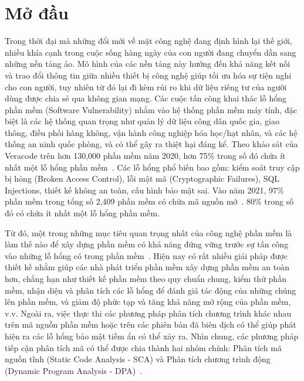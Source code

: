 \chapter*{Mở đầu}
\setcounter{page}{1}
Trong thời đại mà những đổi mới về mặt công nghệ đang định hình lại thế giới, nhiều khía cạnh trong cuộc sống hàng ngày của con người đang chuyển dần sang những nền tảng ảo. Mô hình của các nền tảng này hướng đến khả năng kết nối và trao đổi thông tin giữa nhiều thiết bị công nghệ giúp tối ưu hóa sự tiện nghi cho con người, tuy nhiên từ đó lại đi kèm rủi ro khi dữ liệu riêng tư của người dùng được chia sẻ qua không gian mạng. Các cuộc tấn công khai thác lỗ hổng phần mềm (Software Vulnerability) nhằm vào hệ thống phần mềm máy tính, đặc biệt là các hệ thống quan trọng như quản lý dữ liệu công dân quốc gia, giao thông, điều phối hàng không, vận hành công nghiệp hóa học/hạt nhân, và các hệ thống an ninh quốc phòng, và có thể gây ra thiệt hại đáng kể. Theo khảo sát của Veracode trên hơn 130,000 phần mềm năm 2020, hơn 75\% trong số đó chứa ít nhất một lỗ hổng phần mềm~\cite{veracode}. Các lỗ hổng phổ biến bao gồm: kiểm soát truy cập bị hỏng (Broken Access Control), lỗi mật mã (Cryptographic Failures), SQL Injections, thiết kế không an toàn, cấu hình bảo mật sai. Vào năm 2021, 97\% phần mềm trong tổng số 2,409 phần mềm có chứa mã nguồn mở~\cite{synopsys}. 80\% trong số đó có chứa ít nhất một lỗ hổng phần mềm. 


Từ đó, một trong những mục tiêu quan trọng nhất của công nghệ phần mềm là làm thế nào để xây dựng phần mềm có khả năng đứng vững trước sự tấn công vào những lỗ hổng có trong phần mềm~\cite{mcgraw2006software}. Hiện nay có rất nhiều giải pháp được thiết kế nhằm giúp các nhà phát triển phần mềm xây dựng phần mềm an toàn hơn, chẳng hạn như thiết kế phần mềm theo quy chuẩn chung, kiểm thử phần mềm, nhận diện và phân tích các lỗ hổng để đánh giá tác động của những chúng lên phần mềm, và giảm độ phức tạp và tăng khả năng mở rộng của phần mềm, v.v. Ngoài ra, việc thực thi các phương pháp phân tích chương trình khác nhau trên mã nguồn phần mềm hoặc trên các phiên bản đã biên dịch có thể giúp phát hiện ra các lỗ hổng bảo mật tiềm ẩn có thể xảy ra. Nhìn chung, các phương pháp tiếp cận phân tích mã có thể được chia thành hai nhóm chính: Phân tích mã nguồn tĩnh (Static Code Analysis - SCA) và Phân tích chương trình động (Dynamic Program Analysis - DPA)~\cite{mcgraw2006software}.

